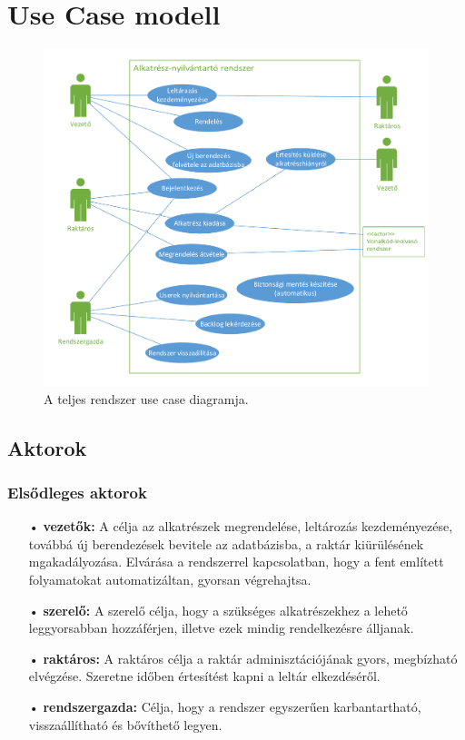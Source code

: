 \documentclass[12pt]{article}\usepackage[left=20mm,right=20mm,top=14mm,bottom=20mm]{geometry}
\begin{document}
\section{Use Case modell}

\begin{figure}[!h]
    \centering
        \includegraphics[width=\textwidth]{kepek/use_case.pdf}
        \caption{A teljes rendszer use case diagramja.}
\end{figure}

\subsection{Aktorok}
\subsubsection{Elsődleges aktorok}
\begin{itemize}
\item[•] \textbf{vezetők: }  A célja az alkatrészek megrendelése, leltározás kezdeményezése, továbbá új berendezések bevitele az adatbázisba, a raktár kiürülésének mgakadályozása. Elvárása a rendszerrel kapcsolatban, hogy a fent említett folyamatokat automatizáltan, gyorsan végrehajtsa.
 
\item[•] \textbf{szerelő: } A szerelő célja, hogy a szükséges alkatrészekhez a lehető leggyorsabban hozzáférjen, illetve ezek mindig rendelkezésre álljanak.

\item[•] \textbf{raktáros: } A raktáros célja a raktár adminisztációjának gyors, megbízható elvégzése. 
Szeretne időben értesítést kapni a leltár elkezdéséről.

\item[•] \textbf{rendszergazda: } Célja, hogy a rendszer egyszerűen karbantartható, visszaállítható és bővíthető legyen.
\end{itemize}
\end{document}
